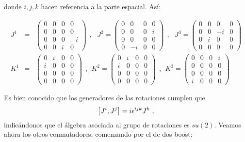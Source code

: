donde $i,j,k$ hacen referencia a la parte espacial. Así:

\begin{eqnarray}
J^{1} &=&\left( 
\begin{array}{cccc}
0 & 0 & 0 & 0 \\ 
0 & 0 & 0 & 0 \\ 
0 & 0 & 0 & -i \\ 
0 & 0 & i & 0%
\end{array}%
\right) ~\ ,~\ \ J^{2}=\left( 
\begin{array}{cccc}
0 & 0 & 0 & 0 \\ 
0 & 0 & 0 & i \\ 
0 & 0 & 0 & 0 \\ 
0 & -i & 0 & 0%
\end{array}%
\right) ~\ ,~\ \ J^{3}=\left( 
\begin{array}{cccc}
0 & 0 & 0 & 0 \\ 
0 & 0 & -i & 0 \\ 
0 & i & 0 & 0 \\ 
0 & 0 & 0 & 0%
\end{array}%
\right)  \\
K^{1} &=&\left( 
\begin{array}{cccc}
0 & i & 0 & 0 \\ 
i & 0 & 0 & 0 \\ 
0 & 0 & 0 & 0 \\ 
0 & 0 & 0 & 0%
\end{array}%
\right) ~\ ,~\ K^{2}=\left( 
\begin{array}{cccc}
0 & i & 0 & 0 \\ 
i & 0 & 0 & 0 \\ 
0 & 0 & 0 & 0 \\ 
0 & 0 & 0 & 0%
\end{array}%
\right) ~\ ,~\ K^{3}=\left( 
\begin{array}{cccc}
0 & 0 & 0 & i \\ 
0 & 0 & 0 & 0 \\ 
0 & 0 & 0 & 0 \\ 
i & 0 & 0 & 0%
\end{array}%
\right) 
\end{eqnarray}

Es bien conocido que los generadores de las rotaciones cumplen que 
\begin{equation}
    \comm{J^{i}}{J^{j}} = i \epsilon^{ijk}J^{k}~,
\end{equation}
indicándonos que el álgebra asociada al grupo de rotaciones es $su(2)$. Veamos ahora los otros conmutadores, comenzando por el de dos boost:


